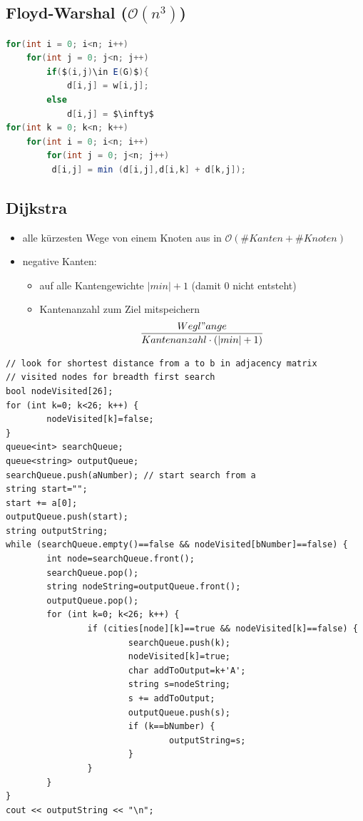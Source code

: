 \documentclass[10pt,a4paper,ngerman,oneside,]{article}
\begin{document}
\begin{multicols}{2}
\subsection{Floyd-Warshal ($\mathcal{O}(n^3)$)}
\begin{lstlisting}[language=java]
for(int i = 0; i<n; i++)
	for(int j = 0; j<n; j++) 
		if($(i,j)\in E(G)$){
			d[i,j] = w[i,j];
		else
			d[i,j] = $\infty$
for(int k = 0; k<n; k++)
	for(int i = 0; i<n; i++)
		for(int j = 0; j<n; j++) 
	     d[i,j] = min (d[i,j],d[i,k] + d[k,j]);
\end{lstlisting}
\subsection{Dijkstra}
		
			\begin{itemize}
				\item alle kürzesten Wege von einem Knoten aus in $\mathcal{O}(\#Kanten+\#Knoten)$
				\item negative Kanten: 
				\begin{itemize}
					\item auf alle Kantengewichte $|min|+1$ (damit 0 nicht entsteht)
					\item Kantenanzahl zum Ziel mitspeichern
					\begin{equation*}
						\frac{Wegl"ange}{Kantenanzahl \cdot (|min|+1)}
					\end{equation*}
				\end{itemize}
			\end{itemize}
				\lstset{language=c}
				\begin{lstlisting}
// look for shortest distance from a to b in adjacency matrix
// visited nodes for breadth first search
bool nodeVisited[26];
for (int k=0; k<26; k++) {
        nodeVisited[k]=false;
}
queue<int> searchQueue;
queue<string> outputQueue;
searchQueue.push(aNumber); // start search from a
string start="";
start += a[0];
outputQueue.push(start);
string outputString;
while (searchQueue.empty()==false && nodeVisited[bNumber]==false) {
        int node=searchQueue.front();
        searchQueue.pop();
        string nodeString=outputQueue.front();
        outputQueue.pop();
        for (int k=0; k<26; k++) {
                if (cities[node][k]==true && nodeVisited[k]==false) {
                        searchQueue.push(k);
                        nodeVisited[k]=true;
                        char addToOutput=k+'A';
                        string s=nodeString;
                        s += addToOutput;
                        outputQueue.push(s);
                        if (k==bNumber) {
                                outputString=s;
                        }
                }
        }
}
cout << outputString << "\n";	
\end{lstlisting}


\end{multicols}
\end{document}

